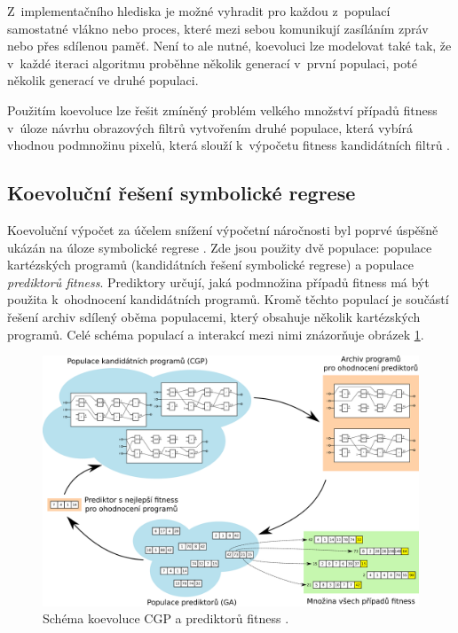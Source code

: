 Z~implementačního hlediska je možné vyhradit pro každou z~populací samostatné vlákno nebo proces, které mezi sebou komunikují zasíláním zpráv nebo přes sdílenou paměť. Není to ale nutné, koevoluci lze modelovat také tak, že v~každé iteraci algoritmu proběhne několik generací v~první populaci, poté několik generací ve druhé populaci.

Použitím koevoluce lze řešit zmíněný problém velkého množství případů fitness v~úloze návrhu obrazových filtrů vytvořením druhé populace, která vybírá vhodnou podmnožinu pixelů, která slouží k~výpočetu fitness kandidátních filtrů \cite{HandbookCoev, SikuEuroGP}.


\subsection{Koevoluční řešení symbolické regrese}

Koevoluční výpočet za účelem snížení výpočetní náročnosti byl poprvé úspěšně ukázán na úloze symbolické regrese \cite{SikuEuroGP}. Zde jsou použity dvě populace: populace kartézských programů (kandidátních řešení symbolické regrese) a populace \emph{prediktorů fitness}. Prediktory určují, jaká podmnožina případů fitness má být použita k~ohodnocení kandidátních programů. Kromě těchto populací je součástí řešení archiv sdílený oběma populacemi, který obsahuje několik kartézských programů. Celé schéma populací a interakcí mezi nimi znázorňuje obrázek \ref{obrKoevoluce}.

\begin{figure}[htb]
    \centering\includegraphics[width=\textwidth]{fig/coevolution.pdf}
    \caption{Schéma koevoluce CGP a prediktorů fitness \cite{SikuEuroGP}.}
    \label{obrKoevoluce}
\end{figure}


